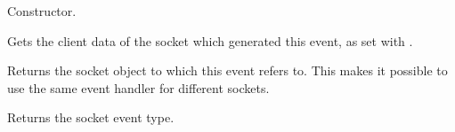 Constructor.

\label{wxsocketeventgetclientdata}


Gets the client data of the socket which generated this event, as
set with .

\label{wxsocketeventgetsocket}


Returns the socket object to which this event refers to. This makes
it possible to use the same event handler for different sockets.

\label{wxsocketeventgetsocketevent}


Returns the socket event type.

